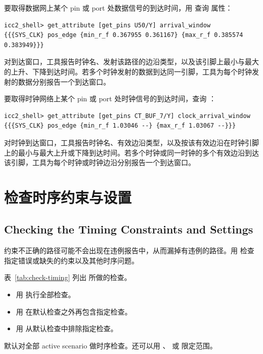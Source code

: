 要取得数据网上某个 pin 或 port 处数据信号的到达时间，用  查询  属性：
\begin{lstlisting}
icc2_shell> get_attribute [get_pins U50/Y] arrival_window
{{{SYS_CLK} pos_edge {min_r_f 0.367955 0.361167} {max_r_f 0.385574 0.383949}}}
\end{lstlisting}

对到达窗口，工具报告时钟名、发射该路径的边沿类型，以及该引脚上最小与最大的上升、下降到达时间。若多个时钟发射的数据到达同一引脚，工具为每个时钟发射的数据分别报告一个到达窗口。

要取得时钟网络上某个 pin 或 port 处时钟信号的到达时间，查询 ：
\begin{lstlisting}
icc2_shell> get_attribute [get_pins CT_BUF_7/Y] clock_arrival_window
{{{SYS_CLK} pos_edge {min_r_f 1.03046 --} {max_r_f 1.03067 --}}}
\end{lstlisting}

对时钟到达窗口，工具报告时钟名、有效边沿类型，以及按该有效边沿在时钟引脚上的最小与最大上升或下降到达时间。若多个时钟或同一时钟的多个有效边沿到达该引脚，工具为每个时钟或时钟边沿分别报告一个到达窗口。

\section{检查时序约束与设置}
\subsection*{Checking the Timing Constraints and Settings}

约束不正确的路径可能不会出现在违例报告中，从而漏掉有违例的路径。用  检查指定错误或缺失的约束以及其他时序问题。

表~\ref{tab:check-timing} 列出  所做的检查。
\begin{itemize}
  \item 用  执行全部检查。
  \item 用  在默认检查之外再包含指定检查。
  \item 用  从默认检查中排除指定检查。
\end{itemize}

默认对全部 active scenario 做时序检查。还可以用 、 或  限定范围。

